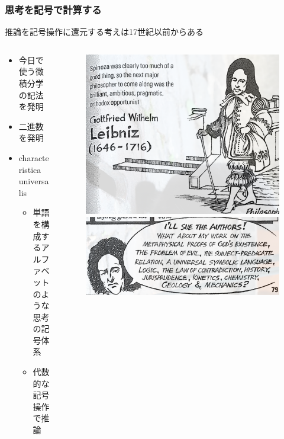 \documentclass[unicode, 14pt, aspectratio=169]{beamer}
\begin{document}
\begin{frame}
  \frametitle{思考を記号で計算する}
  {\large 推論を記号操作に還元する考えは17世紀以前からある}
  \begin{columns}
    \begin{column}{0.6\textwidth}
      \begin{itemize}
        \item 今日で使う微積分学の記法を発明        
        \item 二進数を発明
        \item characteristica universalis
          \begin{itemize}
          \item 単語を構成するアルファベットのような思考の記号体系
          \item 代数的な記号操作で推論
          \end{itemize}
      \end{itemize}
    \end{column}    
    \begin{column}{0.4\textwidth}
      \begin{figure}
        \includegraphics[width=0.7\linewidth]{images/leibniz.png}
        \includegraphics[width=0.7\linewidth]{images/universal.png}
      \end{figure}       
    \end{column} 
  \end{columns}
\end{frame}
\end{document}
